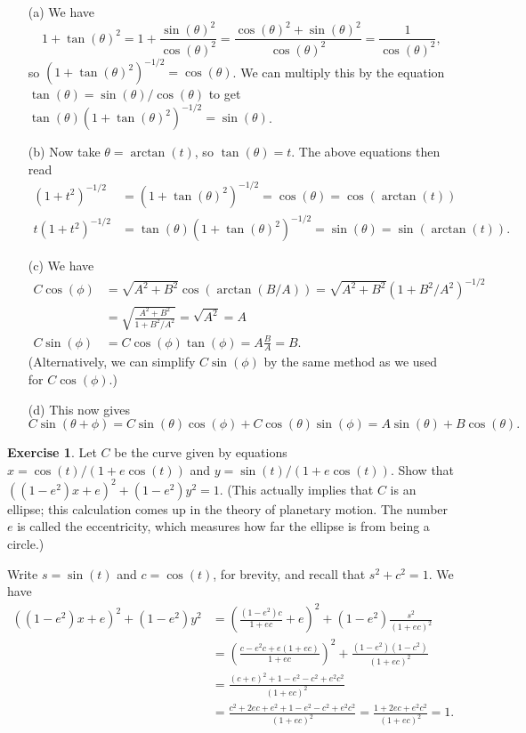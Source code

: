 \documentclass[a4paper]{amsart}
\theoremstyle{definition}
\newtheorem{exercise}{Exercise}[section]
\newenvironment{solution}{{\noindent \bf Solution:}}{}
\begin{document}
\begin{solution}
\begin{itemize}
  \item[(a)] We have 
   \[ 1+\tan(\theta)^2 =
      1+\frac{\sin(\theta)^2}{\cos(\theta)^2} = 
      \frac{\cos(\theta)^2+\sin(\theta)^2}{\cos(\theta)^2} = 
      \frac{1}{\cos(\theta)^2},
   \]
   so $(1+\tan(\theta)^2)^{-1/2}=\cos(\theta)$.  We can
   multiply this by the equation
   $\tan(\theta)=\sin(\theta)/\cos(\theta)$ to get 
   $\tan(\theta)(1+\tan(\theta)^2)^{-1/2}=\sin(\theta)$.
  \item[(b)] Now take $\theta=\arctan(t)$, so
   $\tan(\theta)=t$.  The above equations then read 
   \begin{align*}
    (1+t^2)^{-1/2} &=
     (1+\tan(\theta)^2)^{-1/2}=\cos(\theta)=\cos(\arctan(t)) \\
    t(1+t^2)^{-1/2} &=
     \tan(\theta)(1+\tan(\theta)^2)^{-1/2}=\sin(\theta)=
      \sin(\arctan(t)).
   \end{align*}
  \item[(c)] We have
   \begin{align*}
    C\cos(\phi) 
     &= \sqrt{A^2+B^2}\cos(\arctan(B/A))
      = \sqrt{A^2+B^2}(1+B^2/A^2)^{-1/2} \\
     &= \sqrt{\frac{A^2+B^2}{1+B^2/A^2}}
      = \sqrt{A^2} = A \\
    C\sin(\phi) 
     &= C\cos(\phi)\tan(\phi) = A \frac{B}{A} = B.
   \end{align*}
   (Alternatively, we can simplify $C\sin(\phi)$ by the same
   method as we used for $C\cos(\phi)$.)  
  \item[(d)] This now gives
   \[ C\sin(\theta+\phi) = 
      C\sin(\theta)\cos(\phi) + C\cos(\theta)\sin(\phi) = 
      A\sin(\theta) + B\cos(\theta).
   \]
 \end{itemize}
\end{solution}
\begin{exercise}\label{ex-ellipse}
Let $C$ be the curve given by equations
 $x=\cos(t)/(1+e\cos(t))$ and $y=\sin(t)/(1+e\cos(t))$.
 Show that $((1-e^2)x+e)^2+(1-e^2)y^2=1$.  (This actually
 implies that $C$ is an ellipse; this calculation comes up
 in the theory of planetary motion.  The number $e$ is
 called the eccentricity, which measures how far the ellipse
 is from being a circle.)
\end{exercise}
\begin{solution}
Write $s=\sin(t)$ and $c=\cos(t)$, for brevity, and recall
 that $s^2+c^2=1$.  We have
 \begin{align*}
  ((1-e^2)x+e)^2+(1-e^2)y^2 
  &= \left(\frac{(1-e^2)c}{1+ec}+e\right)^2 + 
     (1-e^2)\frac{s^2}{(1+ec)^2} \\
  &= \left(\frac{c-e^2c+e(1+ec)}{1+ec}\right)^2 +
     \frac{(1-e^2)(1-c^2)}{(1+ec)^2} \\
  &= \frac{(c+e)^2+1-e^2-c^2+e^2c^2}{(1+ec)^2} \\
  &= \frac{c^2+2ec+e^2+1-e^2-c^2+e^2c^2}{(1+ec)^2} 
   = \frac{1+2ec+e^2c^2}{(1+ec)^2} = 1.
 \end{align*}
\end{solution}
\end{document}
